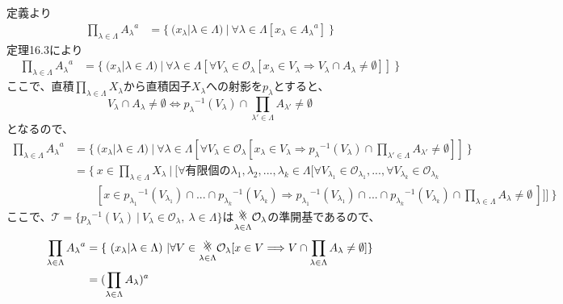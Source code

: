 \documentclass{jsarticle}
\begin{document}
\subsection{}
定義より
\begin{align*}
\prod_{\lambda\in\Lambda}{A_\lambda}^a&=\{\ (x_\lambda|\lambda\in\Lambda)\ |\ \forall\lambda\in\Lambda[x_\lambda\in {A_\lambda}^a]\ \}
\end{align*}
定理16.3により
\begin{align*}
\prod_{\lambda\in\Lambda}{A_\lambda}^a&=\{\ (x_\lambda|\lambda\in\Lambda)\ |\ \forall\lambda\in\Lambda[\forall V_\lambda\in\mathcal{O}_\lambda[x_\lambda\in V_\lambda\Longrightarrow V_\lambda\cap A_\lambda\neq\emptyset]]\ \}
\end{align*}
ここで、直積$\prod_{\lambda\in\Lambda}X_\lambda$から直積因子$X_\lambda$への射影を$p_\lambda$とすると、
\[V_\lambda\cap A_\lambda\neq\emptyset\Longleftrightarrow {p_\lambda}^{-1}(V_\lambda)\cap\prod_{\lambda'\in\Lambda}A_{\lambda'}\neq\emptyset\]
となるので、
\begin{align*}
\prod_{\lambda\in\Lambda}{A_\lambda}^a&=\{\ (x_\lambda|\lambda\in\Lambda)\ |\ \forall\lambda\in\Lambda[\forall V_\lambda\in\mathcal{O}_\lambda[x_\lambda\in V_\lambda\Longrightarrow {p_\lambda}^{-1}(V_\lambda)\cap \prod_{\lambda'\in\Lambda}A_{\lambda'}\neq\emptyset]]\ \}\\
&=\{\ x\in \prod_{\lambda\in\Lambda}X_{\lambda}\ |\ [\forall 有限個の \lambda_1,\lambda_2,...,\lambda_k\in\Lambda[\forall V_{\lambda_1}\in\mathcal{O}_{\lambda_1},...,\forall V_{\lambda_k}\in\mathcal{O}_{\lambda_k}\\
&\ \ \ \ \ \ \ \ \ [x\in{p_{\lambda_1}}^{-1}(V_{\lambda_1})\cap...\cap{p_{\lambda_k}}^{-1}(V_{\lambda_k})\Longrightarrow {p_{\lambda_1}}^{-1}(V_{\lambda_1})\cap...\cap{p_{\lambda_k}}^{-1}(V_{\lambda_k}) \cap \prod_{\lambda\in\Lambda}A_{\lambda}\neq\emptyset\ ]]]\ \}
\end{align*}
ここで、$\mathcal{T}=\{{p_\lambda}^{-1}(V_\lambda)\ |\ V_\lambda\in\mathcal{O}_{\lambda},\ \lambda\in\Lambda\}$は$\underset{\lambda\in\Lambda}{\rotatebox{45}{\#}}\mathcal{O}_\lambda$の準開基であるので、
\begin{align*}
\prod_{\lambda\in\Lambda}{A_\lambda}^a&=\{\ (x_\lambda|\lambda\in\Lambda)\ | \forall V\in\underset{\lambda\in\Lambda}{\rotatebox{45}{\#}}\mathcal{O}_\lambda[x\in V\Longrightarrow V\cap\prod_{\lambda\in\Lambda}A_\lambda\neq\emptyset]\}\\
&=(\prod_{\lambda\in\Lambda}A_\lambda)^a
\end{align*}
\end{document}
